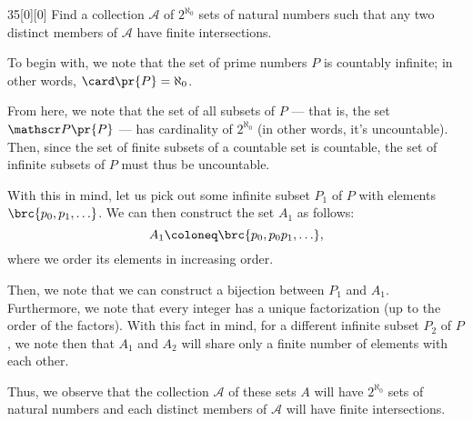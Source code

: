 \documentclass{article}
\begin{document}
\begin{hw}{35}[0][0]
	Find a collection $\mathscr A$ of $2^{\aleph_0}$ sets of natural numbers such that any two distinct members of $\mathscr A$ have finite intersections.
\end{hw}
\begin{solution}
	To begin with, we note that the set of prime numbers $P$ is countably infinite; in other words, $\card \pr{P} = \aleph_0$.
	
	From here, we note that the set of all subsets of $P$ --- that is, the set $\mathscr P \pr{P}$ --- has cardinality of $2^{\aleph_0}$ (in other words, it's uncountable). Then, since the set of finite subsets of a countable set is countable, the set of infinite subsets of $P$ must thus be uncountable.
	
	With this in mind, let us pick out some infinite subset $P_1$ of $P$ with elements $\brc{p_0, p_1, \ldots}$. We can then construct the set $A_1$ as follows:
	\begin{equation*}
		A_1 \coloneq \brc{p_0, p_0p_1, \ldots},
	\end{equation*}
	where we order its elements in increasing order.
	
	Then, we note that we can construct a bijection between $P_1$ and $A_1$. Furthermore, we note that every integer has a unique factorization (up to the order of the factors). With this fact in mind, for a different infinite subset $P_2$ of $P$, we note then that $A_1$ and $A_2$ will share only a finite number of elements with each other.
	
	Thus, we observe that the collection $\mathscr A$ of these sets $A$ will have $2^{\aleph_0}$ sets of natural numbers and each distinct members of $\mathscr A$ will have finite intersections.
\end{solution}
\end{document}
